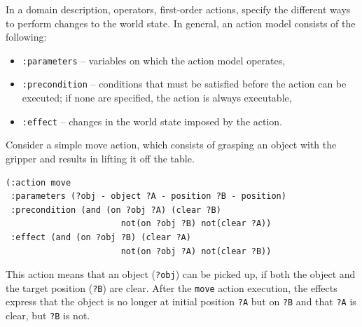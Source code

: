 In a domain description, operators, \ie first-order actions, specify the different ways to perform changes to the world state. 
In general, an action model consists of the following:
\begin{itemize}
	\item \texttt{:parameters} -- variables on which the action model operates,
	\item \texttt{:precondition} -- conditions that must be satisfied before the action can be executed; if none are specified, the action is always executable,
	\item \texttt{:effect} -- changes in the world state imposed by the action.
\end{itemize}
Consider a simple move action, which consists of grasping an object with the gripper and results in lifting it off the table.
\begin{verbatim}
(:action move
 :parameters (?obj - object ?A - position ?B - position)
 :precondition (and (on ?obj ?A) (clear ?B)
                       not(on ?obj ?B) not(clear ?A))
 :effect (and (on ?obj ?B) (clear ?A)
                       not(on ?obj ?A) not(clear ?B))
\end{verbatim}

This action means that an object (\texttt{?obj}) can be picked up, if both the object and the target position (\texttt{?B}) are clear.
After the \texttt{move} action execution, the effects express that the object is no longer at initial position \texttt{?A} but on \texttt{?B} and that \texttt{?A} is clear, but \texttt{?B} is not.


